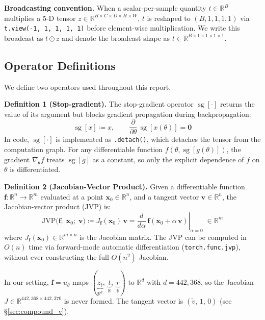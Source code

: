 \documentclass[11pt,a4paper]{article}
\newcommand{\jvp}{\mathrm{JVP}}
\newcommand{\code}[1]{\texttt{#1}}
\DeclareMathOperator{\sg}{sg}        %
\begin{document}
\textbf{Broadcasting convention.}  When a scalar-per-sample quantity $t \in
\mathbb{R}^B$ multiplies a 5-D tensor $z \in \mathbb{R}^{B \times C \times D
\times H \times W}$, $t$ is reshaped to $(B, 1, 1, 1, 1)$ via
\code{t.view(-1, 1, 1, 1, 1)} before element-wise multiplication.  We write
this broadcast as $t \odot z$ and denote the broadcast shape as
$\bar{t} \in \mathbb{R}^{B \times 1 \times 1 \times 1 \times 1}$.

\subsection{Operator Definitions}
\label{sec:operators}

We define two operators used throughout this report.

\textbf{Definition 1 (Stop-gradient).}  The stop-gradient operator
$\sg[\cdot]$ returns the value of its argument but blocks gradient
propagation during backpropagation:
\begin{equation}
  \sg[x] \coloneqq x, \qquad
  \frac{\partial}{\partial \theta}\,\sg[x(\theta)] = \mathbf{0}
  \label{eq:sg_def}
\end{equation}
In code, $\sg[\cdot]$ is implemented as \code{.detach()}, which detaches the
tensor from the computation graph.  For any differentiable function
$f(\theta, \sg[g(\theta)])$, the gradient $\nabla_\theta f$ treats $\sg[g]$
as a constant, so only the explicit dependence of $f$ on $\theta$ is
differentiated.

\textbf{Definition 2 (Jacobian-Vector Product).}  Given a differentiable
function $\mathbf{f}: \mathbb{R}^n \to \mathbb{R}^m$ evaluated at a point
$\mathbf{x}_0 \in \mathbb{R}^n$, and a tangent vector
$\mathbf{v} \in \mathbb{R}^n$, the Jacobian-vector product (JVP) is:
\begin{equation}
  \jvp\bigl(\mathbf{f};\;\mathbf{x}_0;\;\mathbf{v}\bigr)
    \coloneqq J_\mathbf{f}(\mathbf{x}_0)\,\mathbf{v}
    = \left.\frac{d}{d\alpha}\,\mathbf{f}(\mathbf{x}_0 + \alpha\,\mathbf{v})
      \right|_{\alpha=0}
    \;\in \mathbb{R}^m
  \label{eq:jvp_operator}
\end{equation}
where $J_\mathbf{f}(\mathbf{x}_0) \in \mathbb{R}^{m \times n}$ is the
Jacobian matrix.  The JVP can be computed in $O(n)$ time via forward-mode
automatic differentiation (\code{torch.func.jvp}), without ever constructing
the full $O(n^2)$ Jacobian.

In our setting, $\mathbf{f} = u_\theta$ maps
$(\underbrace{z_t}_{\mathbb{R}^d},\;\underbrace{t}_{\mathbb{R}},\;
\underbrace{r}_{\mathbb{R}})$ to $\mathbb{R}^d$ with $d = 442{,}368$, so the
Jacobian $J \in \mathbb{R}^{442{,}368 \times 442{,}370}$ is never formed.
The tangent vector is $(\tilde{v},\,1,\,0)$ (see \S\ref{sec:compound_v}).
\end{document}

